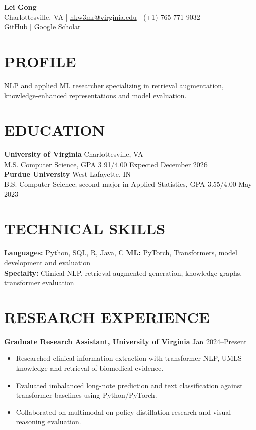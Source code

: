 \documentclass[10pt, letterpaper]{article}
\begin{document}
\setlength{\parindent}{0pt}
\begin{center}
{\fontsize{23}{25}\selectfont\textbf{Lei Gong}}\\[3pt]
Charlottesville, VA \quad | \quad \href{mailto:nkw3mr@virginia.edu}{nkw3mr@virginia.edu} \quad | \quad (+1) 765-771-9032\\[2pt]
\href{https://github.com/LeiGong0125Carrot}{GitHub} \quad | \quad \href{https://scholar.google.com/citations?user=8QLAkKMAAAAJ}{Google Scholar}
\end{center}
\vspace{-3mm}
\section{PROFILE}
NLP and applied ML researcher specializing in retrieval augmentation, knowledge-enhanced representations and model evaluation.
\section{EDUCATION}
\textbf{University of Virginia} \hfill Charlottesville, VA \\
M.S. Computer Science, GPA 3.91/4.00 \hfill Expected December 2026\\[1pt]
\textbf{Purdue University} \hfill West Lafayette, IN \\
B.S. Computer Science; second major in Applied Statistics, GPA 3.55/4.00 \hfill May 2023
\section{TECHNICAL SKILLS}
\textbf{Languages:} Python, SQL, R, Java, C \quad \textbf{ML:} PyTorch, Transformers, model development and evaluation\\
\textbf{Specialty:} Clinical NLP, retrieval-augmented generation, knowledge graphs, transformer evaluation
\section{RESEARCH EXPERIENCE}
\textbf{Graduate Research Assistant, University of Virginia} \hfill Jan 2024--Present
\begin{itemize}
\item Researched clinical information extraction with transformer NLP, UMLS knowledge and retrieval of biomedical evidence.
\item Evaluated imbalanced long-note prediction and text classification against transformer baselines using Python/PyTorch.
\item Collaborated on multimodal on-policy distillation research and visual reasoning evaluation.
\end{itemize}
\end{document}
